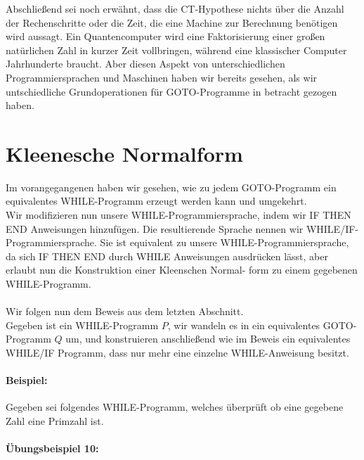 \documentclass[11pt,a4paper,leqno]{report}
\numberwithin{equation}{chapter}
\begin{document}
Abschlie\ss{}end sei noch erw\"ahnt, dass die CT-Hypothese nichts \"uber die Anzahl der Rechenschritte oder die Zeit, die eine Machine zur Berechnung ben\"otigen wird aussagt. Ein Quantencomputer wird eine Faktorisierung einer gro\ss{}en nat\"urlichen Zahl in kurzer Zeit vollbringen, w\"ahrend eine klassischer Computer Jahrhunderte braucht. Aber diesen Aspekt von unterschiedlichen Programmiersprachen und Maschinen haben wir bereits gesehen, als wir untschiedliche Grundoperationen f\"ur GOTO-Programme in betracht gezogen haben.

\section{Kleenesche Normalform}
Im vorangegangenen haben wir gesehen, wie zu jedem GOTO-Programm ein equivalentes WHILE-Programm erzeugt werden kann und umgekehrt.\\
Wir modifizieren nun unsere WHILE-Programmiersprache, indem wir IF THEN END Anweisungen hinzuf\"ugen. Die resultierende Sprache nennen wir WHILE/IF-Programmiersprache. Sie ist equivalent zu unsere WHILE-Programmiersprache, da sich IF THEN END durch WHILE Anweisungen ausdr\"ucken l\"asst, aber erlaubt nun die Konstruktion einer Kleenschen Normal- form zu einem gegebenen WHILE-Programm.\\
\\
Wir folgen nun dem Beweis aus dem letzten Abschnitt.\\
Gegeben ist ein WHILE-Programm $P$, wir wandeln es in ein equivalentes GOTO-Programm $Q$ um, und konstruieren anschlie\ss{}end wie im Beweis ein equivalentes WHILE/IF Programm, dass nur mehr eine einzelne WHILE-Anweisung besitzt. 
\paragraph{Beispiel:} Gegeben sei folgendes WHILE-Programm, welches \"uberpr\"uft ob eine gegebene Zahl eine Primzahl ist.
\paragraph{\"Ubungsbeispiel 10:}
\newpage
\end{document}
